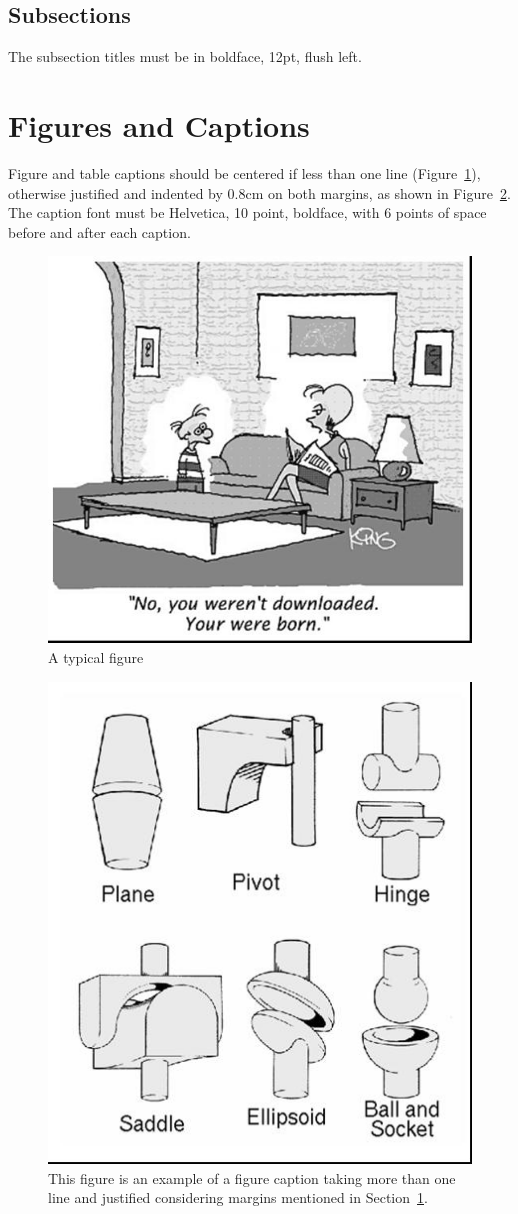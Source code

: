 \documentclass[12pt]{article}
\theoremstyle{plain}
\begin{document}
\subsection{Subsections}

The subsection titles must be in boldface, 12pt, flush left.

\section{Figures and Captions}\label{sec:figs}


Figure and table captions should be centered if less than one line
(Figure~\ref{fig:exampleFig1}), otherwise justified and indented by 0.8cm on
both margins, as shown in Figure~\ref{fig:exampleFig2}. The caption font must
be Helvetica, 10 point, boldface, with 6 points of space before and after each
caption.

\begin{figure}[ht]
\centering
\includegraphics[width=.5\textwidth]{fig1.jpg}
\caption{A typical figure}
\label{fig:exampleFig1}
\end{figure}

\begin{figure}[ht]
\centering
\includegraphics[width=.3\textwidth]{fig2.jpg}
\caption{This figure is an example of a figure caption taking more than one
  line and justified considering margins mentioned in Section~\ref{sec:figs}.}
\label{fig:exampleFig2}
\end{figure}
\end{document}
